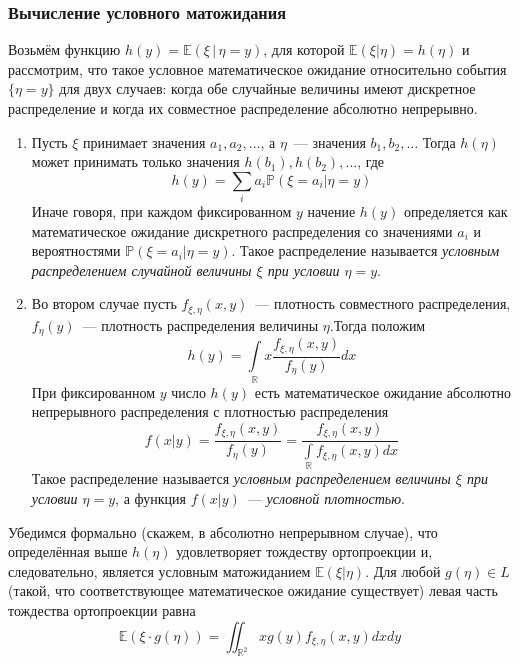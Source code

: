 \documentclass[oneside,final,14pt]{extreport}
\theoremstyle{plain}
\theoremstyle{definition}
\theoremstyle{named}
\begin{document}
\subsubsection{Вычисление условного матожидания}
Возьмём функцию $h(y)=\mathbb{E}(\xi \,|\, \eta=y)$, для которой $\mathbb{E}(\xi | \eta)=h(\eta)$ и рассмотрим, что такое условное математическое ожидание относительно события $\{\eta=y\}$ для двух случаев: когда обе случайные величины имеют дискретное распределение и когда их совместное распределение абсолютно непрерывно.
\begin{enumerate}
    \item Пусть $\xi$ принимает значения $a_{1}, a_{2}, \ldots$, а $\eta$~--- значения $b_{1}, b_{2}, \ldots$ Тогда $h(\eta)$ может принимать только значения $h\left(b_{1}\right), h\left(b_{2}\right), \ldots$, где
    \begin{equation*}
        h(y)=\sum\limits_{i} a_{i} \mathbb{P}\left(\xi=a_{i} | \eta=y\right)
    \end{equation*}
    Иначе говоря, при каждом фиксированном $y$ начение $h(y)$ определяется как математическое ожидание дискретного распределения со значениями $a_{i}$ и вероятностями $\mathbb{P}\left(\xi=a_{i} | \eta=y\right)$. Такое распределение называется {\it условным распределением случайной величины $\xi$ при условии $\eta = y$}.
    
    \item Во втором случае пусть $f_{\xi, \eta}(x, y)$~--- плотность совместного распределения, $f_{\eta}(y)$~--- плотность распределения величины $\eta$.Тогда положим
    \begin{equation*}
        h(y)=\int\limits_{\mathbb{R}} x \frac{f_{\xi, \eta}(x, y)}{f_{\eta}(y)} d x
    \end{equation*}
    При фиксированном $y$ число $h(y)$ есть математическое ожидание абсолютно непрерывного распределения с плотностью распределения
    \begin{equation*}
        f(x | y)=\frac{f_{\xi, \eta}(x, y)}{f_{\eta}(y)}=\frac{f_{\xi, \eta}(x, y)}{\int\limits_{\mathbb{R}} f_{\xi, \eta}(x, y) d x}
    \end{equation*}
    Такое распределение называется {\it условным распределением величины $\xi$ при условии $\eta = y$}, а функция $f(x | y)$~--- {\it условной плотностью}.
\end{enumerate}

    Убедимся формально (скажем, в абсолютно непрерывном случае), что определённая выше $h(\eta)$ удовлетворяет тождеству ортопроекции и, следовательно, является условным матожиданием $\mathbb{E}(\xi | \eta)$. Для любой $g(\eta) \in L$ (такой, что соответствующее математическое ожидание существует) левая часть тождества ортопроекции равна
    \begin{equation*}
        \mathbb{E}(\xi \cdot g(\eta))=\iint_{\mathbb{R}^{2}} x g(y) f_{\xi, \eta}(x, y) d x d y
    \end{equation*}
    
\end{document}
